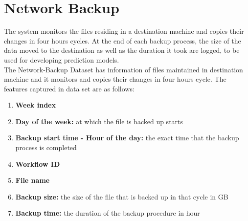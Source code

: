 \documentclass[letterpaper,twocolumn,10pt]{article}
\begin{document}
\section{Network Backup}
The system monitors the files residing in a destination machine and copies their changes in four hours cycles. At the end of each backup process, the size of the data moved to the destination as well as the duration it took are logged, to be used for developing prediction models.\\
The Network-Backup Dataset has information of files maintained in destination machine and it monitors and copies their changes in four hours cycle. The features captured in data set are as follows:
\begin{enumerate}
\item \textbf{Week index}
\item \textbf{Day of the week:} at which the file is backed up starts
\item \textbf{Backup start time - Hour of the day:} the exact time that the backup process is completed
\item \textbf{Workflow ID}
\item \textbf{File name}
\item \textbf{Backup size:} the size of the file that is backed up in that cycle in GB
\item \textbf{Backup time:} the duration of the backup procedure in hour
\end{enumerate}
\end{document}
